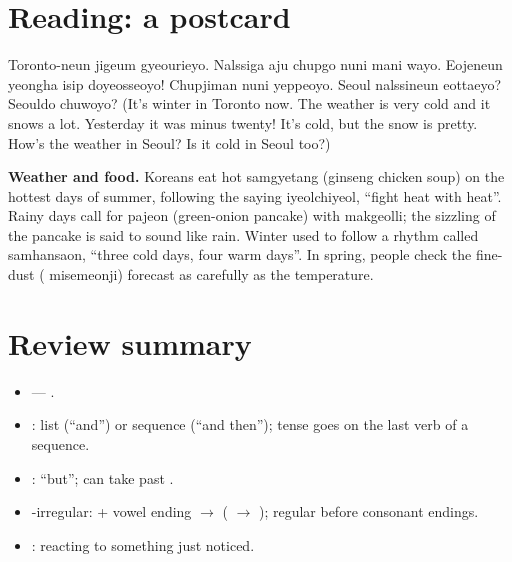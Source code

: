 \section{Reading: a postcard}

\begin{quote}
\end{quote}
Toronto-neun jigeum gyeourieyo. Nalssiga aju chupgo nuni mani wayo. Eojeneun yeongha isip
doyeosseoyo! Chupjiman nuni yeppeoyo. Seoul nalssineun eottaeyo? Seouldo chuwoyo?
(It's winter in Toronto now. The weather is very cold and it snows a lot. Yesterday it
was minus twenty! It's cold, but the snow is pretty. How's the weather in Seoul? Is it
cold in Seoul too?)

\begin{aside}
\textbf{Weather and food.} Koreans eat hot  samgyetang (ginseng chicken soup) on
the hottest days of summer, following the saying  iyeolchiyeol, ``fight heat
with heat''. Rainy days call for  pajeon (green-onion pancake) with
 makgeolli; the sizzling of the pancake is said to sound like rain. Winter
used to follow a rhythm called  samhansaon, ``three cold days, four warm
days''. In spring, people check the fine-dust ( misemeonji) forecast as
carefully as the temperature.
\end{aside}

\section*{Review summary}
\begin{itemize}
  \item {} --- .
  \item {}: list (``and'') or sequence (``and then''); tense goes on the last
        verb of a sequence.
  \item {}: ``but''; can take past .
  \item {}-irregular:  + vowel ending $\to$ 
        ( $\to$ ); regular before consonant endings.
  \item {}: reacting to something just noticed.
\end{itemize}
